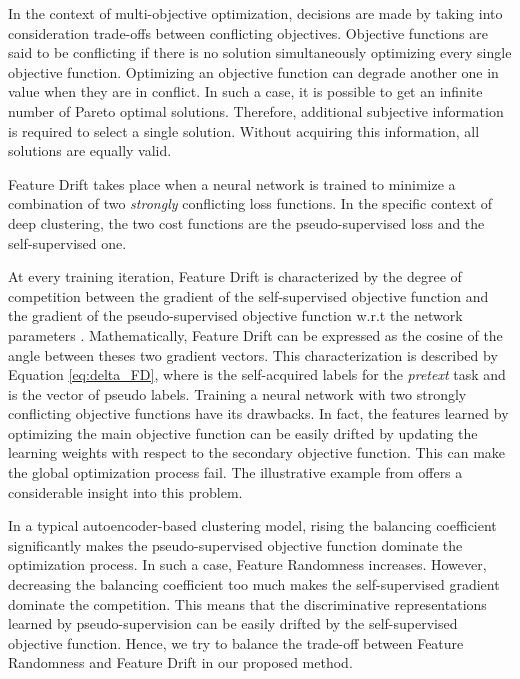 \documentclass{article}
\begin{document}
In the context of multi-objective optimization, decisions are made by taking into consideration trade-offs between conflicting objectives. Objective functions are said to be conflicting if there is no solution simultaneously optimizing every single objective function. Optimizing an objective function can degrade another one in value when they are in conflict. In such a case, it is possible to get an infinite number of Pareto optimal solutions. Therefore, additional subjective information is required to select a single solution. Without acquiring this information, all solutions are equally valid.

Feature Drift takes place when a neural network is trained to minimize a combination of two \textit{strongly} conflicting loss functions. In the specific context of deep clustering, the two cost functions are the pseudo-supervised loss and the self-supervised one. 

At every training iteration, Feature Drift is characterized by the degree of competition between the gradient of the self-supervised objective function and the gradient of the pseudo-supervised objective function w.r.t the network parameters . Mathematically, Feature Drift can be expressed as the cosine of the angle between theses two gradient vectors. This characterization  is described by Equation \ref{eq:delta_FD}, where  is the self-acquired labels for the \textit{pretext} task and  is the vector of pseudo labels. Training a neural network with two strongly conflicting objective functions have its drawbacks. In fact, the features learned by optimizing the main objective function can be easily drifted by updating the learning weights with respect to the secondary objective function. This can make the global optimization process fail. The illustrative example from \cite{paper98} offers a considerable insight into this problem.











In a typical autoencoder-based clustering model, rising the balancing coefficient significantly makes the pseudo-supervised objective function dominate the optimization process. In such a case, Feature Randomness increases. However, decreasing the balancing coefficient too much makes the self-supervised gradient dominate the competition. This means that the discriminative representations learned by pseudo-supervision can be easily drifted by the self-supervised objective function. Hence, we try to balance the trade-off between Feature Randomness and Feature Drift in our proposed method.
\end{document}
